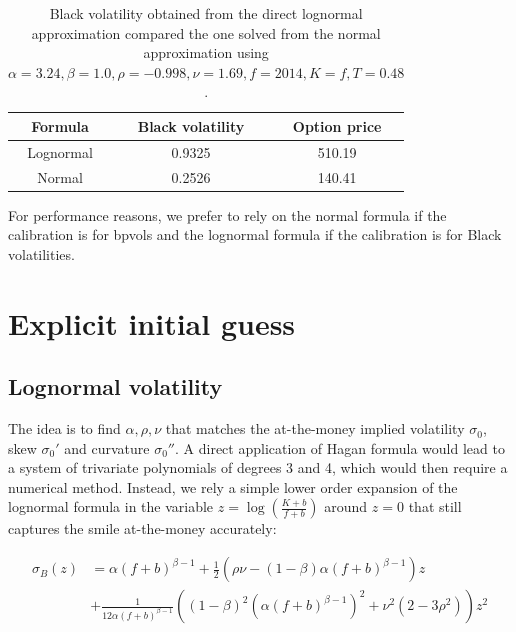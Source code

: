 \documentclass[]{rAMF2e}
\begin{document}
\begin{table}[h]
\begin{center}
\caption{\label{tbl:lognormal_high_alpha}Black volatility obtained from the direct lognormal approximation compared the one solved from the normal approximation using $\alpha=3.24,\beta=1.0,\rho=-0.998, \nu=1.69, f=2014, K=f, T=0.48$.}
\begin{tabular}{|c|c|c|}
\hline
Formula & Black volatility & Option price \\ 
\hline
Lognormal & 0.9325 & 510.19 \\
Normal & 0.2526 & 140.41 \\
\hline
\end{tabular}
\end{center}
\end{table}
For performance reasons, we prefer to rely on the normal formula if the calibration is for bpvols and the lognormal formula if the calibration is for Black volatilities.


\section{Explicit initial guess}
\subsection{Lognormal volatility}
The idea is to find $\alpha, \rho, \nu$ that matches the at-the-money implied volatility $\sigma_0$, skew $\sigma_0'$ and curvature $\sigma_0''$. A direct application of Hagan formula would lead to a system of trivariate polynomials of degrees 3 and 4, which would then require a numerical method. Instead, we rely a simple lower order expansion of the lognormal formula in the variable $z=\log\left(\frac{K+b}{f+b}\right)$ around $z=0$ that still captures the smile at-the-money accurately:

\begin{align}
\sigma_B(z) &= \alpha (f+b)^{\beta-1} + \frac{1}{2}\left(\rho \nu - (1-\beta)\alpha (f+b)^{\beta-1}\right)z \nonumber\\
&+ \frac{1}{12\alpha (f+b)^{\beta-1}}\left((1-\beta)^2(\alpha (f+b)^{\beta-1})^2 + \nu^2(2-3\rho^2)\right)z^2
\end{align}
\end{document}
